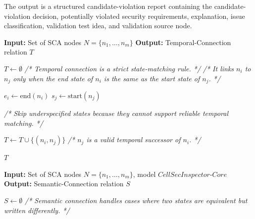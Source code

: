 \documentclass[sigconf]{acmart}
\newcommand{\core}{\textit{CellSecInspector-Core}\xspace}
\begin{document}
{The output is a structured candidate-violation report containing the
candidate-violation decision, potentially violated security
requirements, explanation, issue classification, validation test idea,
and validation source node.


\begin{algorithm}[ht]
\caption{Temporal Connection}
\label{alg:temporal_connection}
\scriptsize
\begin{algorithmic}[1]

\State \textbf{Input:} Set of SCA nodes $N=\{n_1,\dots,n_m\}$
\State \textbf{Output:} Temporal-Connection relation $T$

\State $T \leftarrow \emptyset$
\State \textit{/* Temporal connection is a strict state-matching rule. */}
\State \textit{/* It links $n_i$ to $n_j$ only when the end state of $n_i$ is the same as the start state of $n_j$. */}


    \State $e_i \leftarrow \text{end}(n_i)$
    \State $s_j \leftarrow \text{start}(n_j)$

    \State \textit{/* Skip underspecified states because they cannot support reliable temporal matching. */}

        \State $T \leftarrow T \cup \{(n_i,n_j)\}$
        \State \textit{/* $n_j$ is a valid temporal successor of $n_i$. */}

    \EndIf

\EndFor

\State \Return $T$

\end{algorithmic}
\end{algorithm}

\begin{algorithm}[ht]
\caption{Semantic Connection}
\label{alg:semantic_connection}
\scriptsize
\begin{algorithmic}[1]

\State \textbf{Input:} Set of SCA nodes $N=\{n_1,\dots,n_m\}$, model $\core$
\State \textbf{Output:} Semantic-Connection relation $S$

\State $S \leftarrow \emptyset$
\State \textit{/* Semantic connection handles cases where two states are equivalent but written differently. */}



\end{algorithmic}
\end{algorithm}}
\end{document}
